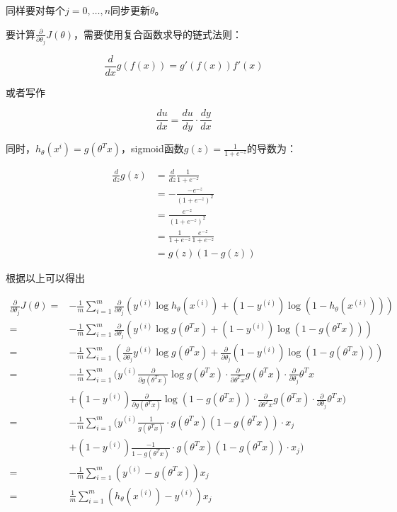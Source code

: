 \documentclass[12pt, a4paper]{article}
\begin{document}
同样要对每个$j=0,\dots,n$同步更新$\theta$。

要计算$\frac{\partial}{\partial\theta_j}J(\theta)$，需要使用复合函数求导的链式法则：

\begin{equation*}
    \frac{d}{dx}g(f(x)) = g'(f(x))f'(x)
\end{equation*}

或者写作

\begin{equation*}
    \frac{du}{dx} = \frac{du}{dy}\cdot\frac{dy}{dx}
\end{equation*}

同时，$h_\theta(x^i) = g(\theta^Tx)$，sigmoid函数$g(z) = \frac{1}{1+e^{-z}}$的导数为：

\begin{align*}
    \frac{d}{dz}g(z) & = \frac{d}{dz}\frac{1}{1+e^{-z}} \\
    & = -\frac{-e^{-z}}{(1+e^{-z})^2}\\
    & = \frac{e^{-z}}{(1+e^{-z})^2} \\
    & = \frac{1}{1+e^{-z}}\frac{e^{-z}}{1+e^{-z}}\\
    & = g(z)(1-g(z))
\end{align*}

根据以上可以得出

\begin{align*}
    \frac{\partial}{\partial\theta_j}J(\theta) =&-\frac{1}{m}\sum_{i=1}^{m}\frac{\partial}{\partial\theta_j}(y^{(i)}\log h_\theta(x^{(i)})+(1-y^{(i)})\log(1-h_\theta(x^{(i)})))\\
     =&-\frac{1}{m}\sum_{i=1}^{m}\frac{\partial}{\partial\theta_j}(y^{(i)}\log g(\theta^Tx)+(1-y^{(i)})\log(1-g(\theta^Tx)))\\
     =&-\frac{1}{m}\sum_{i=1}^{m}(\frac{\partial}{\partial\theta_j}y^{(i)}\log g(\theta^Tx) + \frac{\partial}{\partial\theta_j}(1-y^{(i)})\log(1-g(\theta^Tx))) \\
     =&-\frac{1}{m}\sum_{i=1}^{m}(y^{(i)}\frac{\partial}{\partial g(\theta^Tx)}\log g(\theta^Tx)\cdot\frac{\partial}{\partial\theta^Tx}g(\theta^Tx)\cdot\frac{\partial}{\partial\theta_j}\theta^Tx\\
     &+(1-y^{(i)})\frac{\partial}{\partial g(\theta^Tx)}\log(1-g(\theta^Tx))\cdot\frac{\partial}{\partial\theta^Tx}g(\theta^Tx)\cdot\frac{\partial}{\partial\theta_j}\theta^Tx) \\
     =&-\frac{1}{m}\sum_{i=1}^{m}(y^{(i)}\frac{1}{g(\theta^Tx)}\cdot g(\theta^Tx)(1-g(\theta^Tx))\cdot x_j \\
     &+(1-y^{(i)})\frac{-1}{1-g(\theta^Tx)}\cdot g(\theta^Tx)(1-g(\theta^Tx))\cdot x_j) \\
     =&-\frac{1}{m}\sum_{i=1}^{m}(y^{(i)}-g(\theta^Tx))x_j \\
     =&\frac{1}{m}\sum_{i=1}^{m}(h_\theta(x^{(i)})-y^{(i)})x_j
\end{align*}
\end{document}
